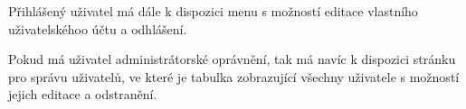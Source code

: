 Přihlášený uživatel má dále k dispozici menu s možností editace vlastního uživatelskéhoo účtu a odhlášení.

Pokud má uživatel administrátorské oprávnění, tak má navíc k dispozici stránku pro správu uživatelů, ve které je tabulka zobrazující všechny uživatele s možností jejich editace a odstranění.

